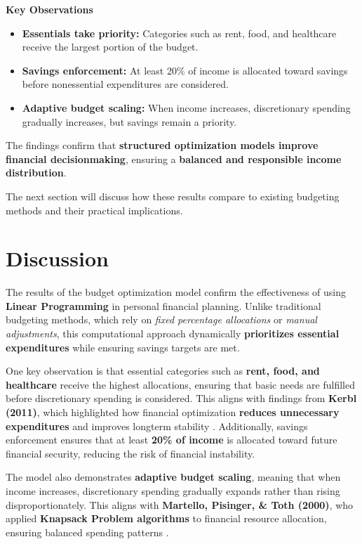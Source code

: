 \documentclass{article}
\begin{document}
\textbf{Key Observations} \\
\begin{itemize}
    \item \textbf{Essentials take priority:} Categories such as rent, food, and healthcare receive the largest portion of the budget.
    \item \textbf{Savings enforcement:} At least 20\% of income is allocated toward savings before nonessential expenditures are considered.
    \item \textbf{Adaptive budget scaling:} When income increases, discretionary spending gradually increases, but savings remain a priority.
\end{itemize}

The findings confirm that \textbf{structured optimization models improve financial decisionmaking}, ensuring a \textbf{balanced and responsible income distribution}.

The next section will discuss how these results compare to existing budgeting methods and their practical implications.

\section{Discussion}

The results of the budget optimization model confirm the effectiveness of using \textbf{Linear Programming} in personal financial planning. Unlike traditional budgeting methods, which rely on \textit{fixed percentage allocations} or \textit{manual adjustments}, this computational approach dynamically \textbf{prioritizes essential expenditures} while ensuring savings targets are met.

One key observation is that essential categories such as \textbf{rent, food, and healthcare} receive the highest allocations, ensuring that basic needs are fulfilled before discretionary spending is considered. This aligns with findings from \textbf{Kerbl (2011)}, which highlighted how financial optimization \textbf{reduces unnecessary expenditures} and improves longterm stability \cite{kerbl2011optimization}. Additionally, savings enforcement ensures that at least \textbf{20\% of income} is allocated toward future financial security, reducing the risk of financial instability.

The model also demonstrates \textbf{adaptive budget scaling}, meaning that when income increases, discretionary spending gradually expands rather than rising disproportionately. This aligns with \textbf{Martello, Pisinger, \& Toth (2000)}, who applied \textbf{Knapsack Problem algorithms} to financial resource allocation, ensuring balanced spending patterns \cite{martello2000knapsack}.
\end{document}
